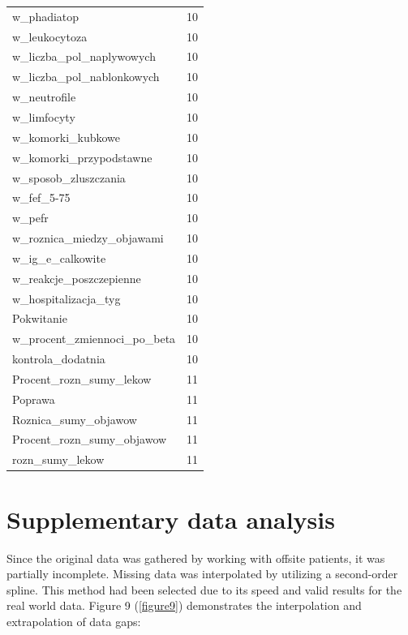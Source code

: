 \documentclass[10pt,oneside]{memoir}
\begin{document}
\begin{table}[htbp]
\begin{minipage}{\linewidth}
\begin{tabulary}{\linewidth}{@{}l@{}l@{}}
w\_phadiatop&10 \\
w\_leukocytoza&10 \\
w\_liczba\_pol\_naplywowych&10 \\
w\_liczba\_pol\_nablonkowych&10 \\
w\_neutrofile&10 \\
w\_limfocyty&10 \\
w\_komorki\_kubkowe&10 \\
w\_komorki\_przypodstawne&10 \\
w\_sposob\_zluszczania&10 \\
w\_fef\_5-75&10 \\
w\_pefr&10 \\
w\_roznica\_miedzy\_objawami&10 \\
w\_ig\_e\_calkowite&10 \\
w\_reakcje\_poszczepienne&10 \\
w\_hospitalizacja\_tyg&10 \\
Pokwitanie&10 \\
w\_procent\_zmiennoci\_po\_beta&10 \\
kontrola\_dodatnia&10 \\
Procent\_rozn\_sumy\_lekow&11 \\
Poprawa&11 \\
Roznica\_sumy\_objawow&11 \\
Procent\_rozn\_sumy\_objawow&11 \\
rozn\_sumy\_lekow&11 \\

		\bottomrule
	\end{tabulary}
\end{minipage}
\end{table}

\section{Supplementary data analysis}
\label{supplementarydataanalysis}

Since the original data was gathered by working with offsite patients, it was partially incomplete. Missing data was interpolated by utilizing a second-order spline. This method had been selected due to its speed and valid results for the real world data. Figure 9 (\autoref{figure9}) demonstrates the interpolation and extrapolation of data gaps:


\begin{figure}
\begin{center}
\end{center}
\label{figure9}
\end{figure}
\end{document}

